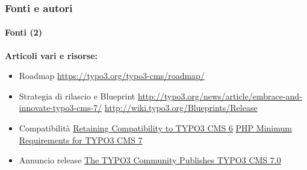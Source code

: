 \begin{frame}[fragile]
	\frametitle{Fonti e autori}
	\framesubtitle{Fonti (2)}

	\textbf{Articoli vari e risorse:}
		\begin{itemize}\smaller

			\item Roadmap\newline
				\url{https://typo3.org/typo3-cms/roadmap/}
			\item Strategia di rilascio e Blueprint\newline
				\url{http://typo3.org/news/article/embrace-and-innovate-typo3-cms-7/}
				\url{http://wiki.typo3.org/Blueprints/Release}
			\item Compatibilità\newline
				\href{http://typo3.org/news/article/retaining-compatibility-to-typo3-cms6/}{Retaining Compatibility to TYPO3 CMS 6}\newline
				\href{http://typo3.org/news/article/php-minimum-requirements-for-typo3-cms-7/}{PHP Minimum Requirements for TYPO3 CMS 7}
			\item Annuncio release\newline
				\href{http://typo3.org/news/article/the-typo3-community-publishes-typo3-cms-70-a-new-version-of-its-free-content-management-system/}{The TYPO3 Community Publishes TYPO3 CMS 7.0}

		\end{itemize}

\end{frame}


